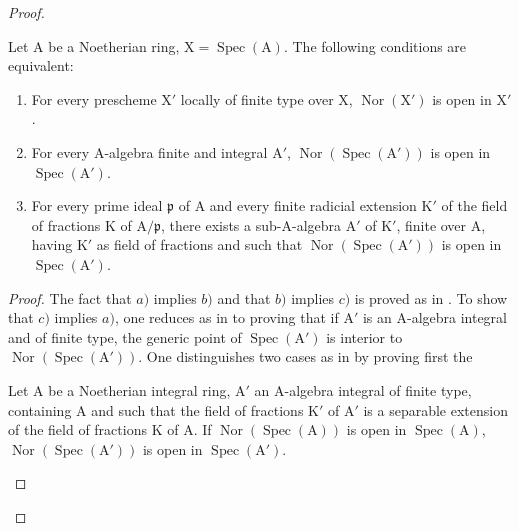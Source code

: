 \begin{proof}
\begin{proposition}[6.13.7]
\label{IV.6.13.7}
Let $\mathrm{A}$ be a Noetherian ring, $\mathrm{X}=\operatorname{Spec}(\mathrm{A})$. The following conditions are equivalent:
\begin{enumerate}[label=\emph{\alph*)}]
  \item For every prescheme $\mathrm{X}'$ locally of finite type over $\mathrm{X}$, $\operatorname{Nor}(\mathrm{X}')$ is open in $\mathrm{X}'$.
  \item For every $\mathrm{A}$-algebra finite and integral $\mathrm{A}'$, $\operatorname{Nor}(\operatorname{Spec}(\mathrm{A}'))$ is open in $\operatorname{Spec}(\mathrm{A}')$.
  \item For every prime ideal $\mathfrak{p}$ of $\mathrm{A}$ and every finite radicial extension $\mathrm{K}'$ of the field of fractions $\mathrm{K}$ of $\mathrm{A}/\mathfrak{p}$, there exists a
sub-$\mathrm{A}$-algebra $\mathrm{A}'$ of $\mathrm{K}'$, finite over $\mathrm{A}$, having $\mathrm{K}'$ as field of fractions and such that $\operatorname{Nor}(\operatorname{Spec}(\mathrm{A}'))$ is open in $\operatorname{Spec}(\mathrm{A}')$.
\end{enumerate}
\end{proposition}

\begin{proof}
The fact that $a)$ implies $b)$ and that $b)$ implies $c)$ is proved as in . To show that $c)$
implies $a)$, one reduces as in  to proving that if $\mathrm{A}'$ is an $\mathrm{A}$-algebra
integral and of finite type, the generic point of $\operatorname{Spec}(\mathrm{A}')$ is interior to $\operatorname{Nor}(\operatorname{Spec}(\mathrm{A}'))$. One distinguishes two cases
as in  by proving first the

\begin{lemma}[6.13.7.1]
\label{IV.6.13.7.1}
Let $\mathrm{A}$ be a Noetherian integral ring, $\mathrm{A}'$ an $\mathrm{A}$-algebra integral of finite type, containing $\mathrm{A}$ and such
that the field of fractions $\mathrm{K}'$ of $\mathrm{A}'$ is a separable extension of the field of fractions $\mathrm{K}$ of $\mathrm{A}$. If $\operatorname{Nor}(\operatorname{Spec}(\mathrm{A}))$ is open in
$\operatorname{Spec}(\mathrm{A})$, $\operatorname{Nor}(\operatorname{Spec}(\mathrm{A}'))$ is open in $\operatorname{Spec}(\mathrm{A}')$.
\end{lemma}


\end{proof}
\end{proof}
